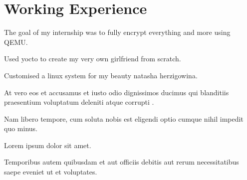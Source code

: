 \documentclass[]{resume}
\begin{document}
\begin{minipage}[t]{0.66\textwidth} 	
\section{Working Experience}
	 
	\vspace{\topsep} %
	\begin{tightemize}
		
		\item The goal of my internship was to fully encrypt everything and more using QEMU.
		\item Used yocto to create my very own girlfriend from scratch.
		\item Customised a linux system for my beauty natasha herzigowina. 

	\end{tightemize}
	\sectionsep

	 
	\begin{tightemize}
		
		\item At vero eos et accusamus et iusto odio dignissimos ducimus qui blanditiis praesentium voluptatum deleniti atque corrupti .
		\item Nam libero tempore, cum soluta nobis est eligendi optio cumque nihil impedit quo minus. 	
		\item Lorem ipsum dolor sit amet.
		\item Temporibus autem quibusdam et aut officiis debitis aut rerum necessitatibus saepe eveniet ut et voluptates. 
		
	\end{tightemize}
	\sectionsep

	\begin{tightemize}
		

\end{tightemize}
\end{minipage}
\end{document}
